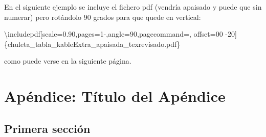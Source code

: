 \documentclass[12pt,a4paper,oneside,]{book}
\def\ifdoblecara{} %
\let\ifdoblecara\undefined %
\def\ifprincipal{} %
\newenvironment{Shaded}{\begin{snugshade}}{\end{snugshade}}
\newcommand{\FunctionTok}[1]{\textcolor[rgb]{0.00,0.00,0.00}{#1}}
\newcommand{\NormalTok}[1]{#1}
\numberwithin{dummy}{section}
\theoremstyle{ocrenumbox}
\theoremstyle{blacknumex}
\theoremstyle{blacknumbox}
\theoremstyle{ocrenum}
\theoremstyle{ocrenum}
\begin{document}
En el siguiente ejemplo se incluye el fichero pdf (vendría apaisado y
puede que sin numerar) pero rotándolo 90 grados para que quede en
vertical:

\begin{Shaded}
\begin{Highlighting}[]
\FunctionTok{\textbackslash{}includepdf}\NormalTok{[scale=0.90,pages=1{-},angle=90,pagecommand=,}
\NormalTok{offset=00 {-}20]\{chuleta\_tabla\_kableExtra\_apaisada\_texrevisado.pdf\}}
\end{Highlighting}
\end{Shaded}

como puede verse en la siguiente página.



\FloatBarrier

\appendix

\ifdefined\ifprincipal
\else
\setlength{\parindent}{1em}
\pagestyle{fancy}
\setcounter{tocdepth}{4}
\tableofcontents

\nocite{Luque2017,Luque2019,RStudio,R-base2,
R-knitr,R-rmarkdown,R-dplyr,R-ggplot2,Techopedia}

\fi

\ifdefined\ifdoblecara
\fancyhead{}{}
\fancyhead[LE,RO]{\scriptsize\rightmark}
\fancyfoot[LO,RE]{\scriptsize\slshape \leftmark}
\fancyfoot[C]{}
\fancyfoot[LE,RO]{\footnotesize\thepage}
\else
\fancyhead{}{}
\fancyhead[RO]{\scriptsize\rightmark}
\fancyfoot[LO]{\scriptsize\slshape \leftmark}
\fancyfoot[C]{}
\fancyfoot[RO]{\footnotesize\thepage}
\fi

\renewcommand{\headrulewidth}{0.4pt}
\renewcommand{\footrulewidth}{0.4pt}

\hypertarget{apuxe9ndice-tuxedtulo-del-apuxe9ndice}{%
\chapter{Apéndice: Título del
Apéndice}\label{apuxe9ndice-tuxedtulo-del-apuxe9ndice}}

\hypertarget{primera-secciuxf3n-4}{%
\section{Primera sección}\label{primera-secciuxf3n-4}}

\ifdefined\ifprincipal
\else
\setlength{\parindent}{1em}
\pagestyle{fancy}
\setcounter{tocdepth}{4}
\tableofcontents
\end{document}
